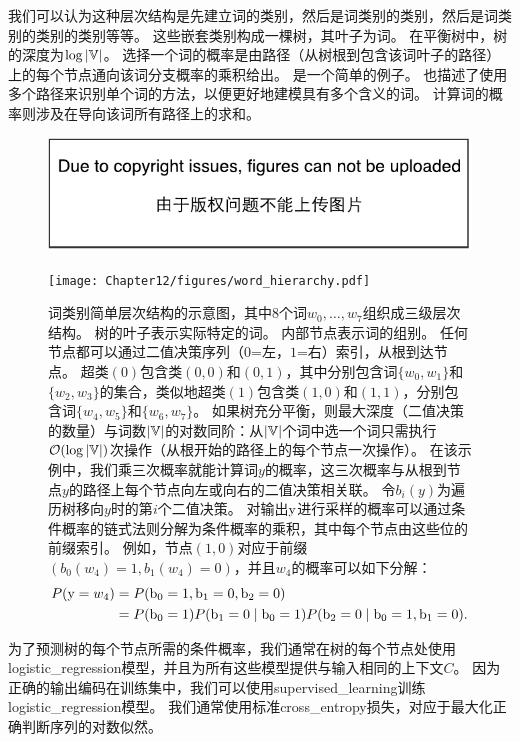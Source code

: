 我们可以认为这种层次结构是先建立词的类别，然后是词类别的类别，然后是词类别的类别的类别等等。
这些嵌套类别构成一棵树，其叶子为词。
在平衡树中，树的深度为$\log |\mathbb{V}|$。
选择一个词的概率是由路径（从树根到包含该词叶子的路径）上的每个节点通向该词分支概率的乘积给出。
是一个简单的例子。
\citet{Mnih+Hinton-2009}也描述了使用多个路径来识别单个词的方法，以便更好地建模具有多个含义的词。
计算词的概率则涉及在导向该词所有路径上的求和。
\begin{figure}[htp]
\centering
\ifOpenSource
\centerline{\includegraphics{figure.pdf}}
\else
\texttt{[image: Chapter12/figures/word\_hierarchy.pdf]}
\fi
\captionsetup{singlelinecheck=off}
\caption[.]{词类别简单层次结构的示意图，其中8个词$w_0,\dots,w_7$组织成三级层次结构。
树的叶子表示实际特定的词。
内部节点表示词的组别。
任何节点都可以通过二值决策序列（$0$=左，$1$=右）索引，从根到达节点。
超类$(0)$包含类$(0,0)$和$(0,1)$，其中分别包含词$\{w_0,w_1\}$和$\{w_2,w_3\}$的集合，类似地超类$(1)$包含类$(1,0)$和$(1,1)$，分别包含词$\{w_4,w_5\}$和$\{w_6,w_7\}$。
如果树充分平衡，则最大深度（二值决策的数量）与词数$| \mathbb{V} |$的对数同阶：从$| \mathbb{V} |$个词中选一个词只需执行$\mathcal{O}(\log |\mathbb{V}|)$次操作（从根开始的路径上的每个节点一次操作）。
在该示例中，我们乘三次概率就能计算词$y$的概率，这三次概率与从根到节点$y$的路径上每个节点向左或向右的二值决策相关联。
令$b_i(y)$为遍历树移向$y$时的第$i$个二值决策。
对输出$\mathrm{y}$进行采样的概率可以通过条件概率的链式法则分解为条件概率的乘积，其中每个节点由这些位的前缀索引。
例如，节点$(1,0)$对应于前缀$(b_0(w_4)=1, b_1(w_4)=0)$，并且$w_4$的概率可以如下分解：
\begin{align}
  P(\mathrm{y} = w_4) &= P(\mathrm{b}_0 = 1, \mathrm{b}_1 = 0, \mathrm{b}_2 = 0) \\
    &= P(\mathrm{b}_0 = 1) P(\mathrm{b}_1 = 0 \mid \mathrm{b}_0 = 1) P(\mathrm{b}_2 = 0 \mid \mathrm{b}_0 = 1, \mathrm{b}_1 = 0). 
\end{align}
}
\label{fig:chap12_word_hierarchy}
\end{figure}

为了预测树的每个节点所需的条件概率，我们通常在树的每个节点处使用\gls{logistic_regression}模型，并且为所有这些模型提供与输入相同的上下文$C$。
因为正确的输出编码在训练集中，我们可以使用\gls{supervised_learning}训练\gls{logistic_regression}模型。
我们通常使用标准\gls{cross_entropy}损失，对应于最大化正确判断序列的对数似然。

